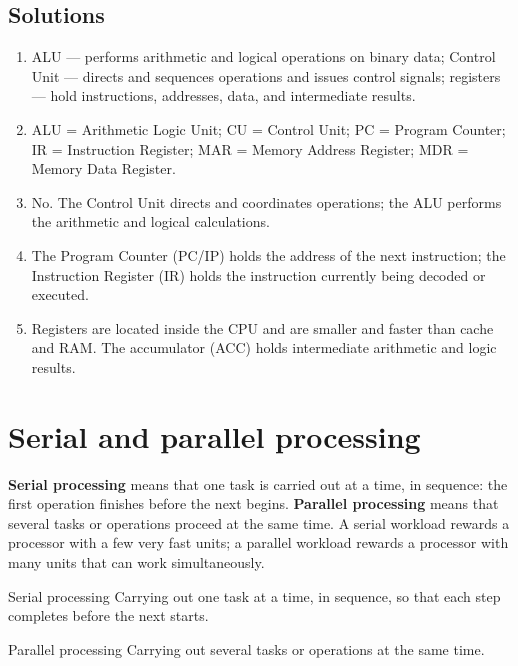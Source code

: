 \subsection*{Solutions}
\begingroup\small
\begin{enumerate}[label=\arabic*.]
  \item ALU --- performs arithmetic and logical operations on binary data;
    Control Unit --- directs and sequences operations and issues control
    signals; registers --- hold instructions, addresses, data, and
    intermediate results.
  \item ALU = Arithmetic Logic Unit; CU = Control Unit; PC = Program
    Counter; IR = Instruction Register; MAR = Memory Address Register;
    MDR = Memory Data Register.
  \item No. The Control Unit directs and coordinates operations; the ALU
    performs the arithmetic and logical calculations.
  \item The Program Counter (PC/IP) holds the address of the next
    instruction; the Instruction Register (IR) holds the instruction
    currently being decoded or executed.
  \item Registers are located inside the CPU and are smaller and faster than
    cache and RAM. The accumulator (ACC) holds intermediate arithmetic and
    logic results.
\end{enumerate}
\endgroup

\section{Serial and parallel processing}
\textbf{Serial processing} means that one task is carried out at a time, in
sequence: the first operation finishes before the next begins. \textbf{Parallel
processing} means that several tasks or operations proceed at the same time.
A serial workload rewards a processor with a few very fast units; a parallel
workload rewards a processor with many units that can work simultaneously.

\begin{definitionbox}{Serial processing}
Carrying out one task at a time, in sequence, so that each step completes
before the next starts.
\end{definitionbox}

\begin{definitionbox}{Parallel processing}
Carrying out several tasks or operations at the same time.
\end{definitionbox}

